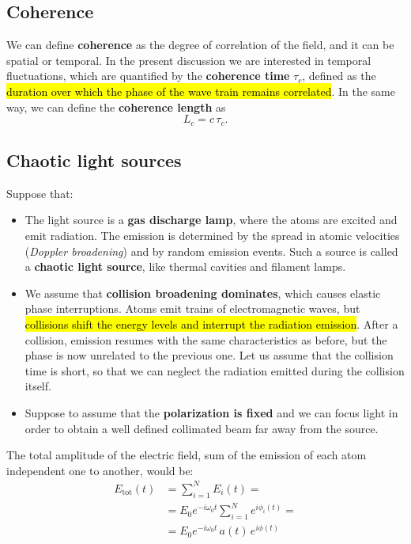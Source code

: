 \subsection{Coherence}

We can define \textbf{coherence} as the degree of correlation of the field, and it can be spatial or temporal. In the present discussion we are interested in temporal fluctuations, which are quantified by the \textbf{coherence time} $\tau_c$, defined as the \hl{duration over which the phase of the wave train remains correlated}. In the same way, we can define the \textbf{coherence length} as
\[
L_c = c\,\tau_c.
\]


\subsection{Chaotic light sources}\label{subsec:6-chaotic-light-sources}

Suppose that:
\begin{itemize}
    \item The light source is a \textbf{gas discharge lamp}, where the atoms are excited and emit radiation. The emission is determined by the spread in atomic velocities (\emph{Doppler broadening}) and by random emission events. Such a source is called a \textbf{chaotic light source}, like thermal cavities and filament lamps.
    
     \item We assume that \textbf{collision broadening dominates}, which causes elastic phase interruptions. Atoms emit trains of electromagnetic waves, but \hl{collisions shift the energy levels and interrupt the radiation emission}. After a collision, emission resumes with the same characteristics as before, but the phase is now unrelated to the previous one. 
     Let us assume that the collision time is short, so that we can neglect the radiation emitted during the collision itself.
     
    \item Suppose to assume that the \textbf{polarization is fixed} and we can focus light in order to obtain a well defined collimated beam far away from the source. 
 \end{itemize}

The total amplitude of the electric field, sum of the emission of each atom independent one to another, would be:
\begin{equation}\label{eqn:6-total-field}
\begin{split}
E_{\text{tot}}(t) &= \sum_{i=1}^{N} E_i(t) = \\[0.5ex]
&= E_0 e^{-i\omega_0 t}\sum_{i=1}^{N} e^{i\phi_i(t)} = \\[0.5ex]
&= E_0 e^{-i\omega_0 t}\, a(t)\, e^{i\phi(t)}
\end{split}
\end{equation}

